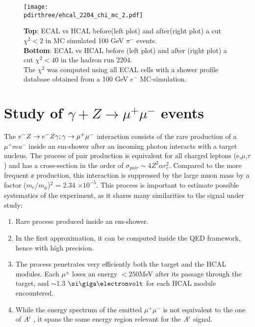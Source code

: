 \begin{figure}[h!]
  \begin{center}
    \texttt{[image: \\pdirthree/ehcal\_2204\_chi\_mc\_2.pdf]}
  \end{center}
  \caption{\textbf{Top}: ECAL vs HCAL before(left plot) and
    after(right plot) a cut
    $\chi^2<2$ in MC simulated 100 GeV $\pi^-$ events. \\
    \textbf{Bottom}: ECAL vs HCAL before (left plot) and after (right
    plot) a cut
    $\chi^2<40$ in the hadron run 2204.\\
    The $\chi^2$ was computed using all ECAL cells with a shower
    profile database obtained from a 100 GeV $e^-$ MC-simulation. }
  \label{fig:ehcal_hadr}
\end{figure}
\fi

\section{Study of $\gamma + Z \rightarrow \mu^+ \mu^-$ events }
\label{ch3:sec:dimuons}

The $e^- Z \to e^- Z \gamma; \gamma \to \mu^+ \mu^-$ interaction consists of the rare production of a $\mu^+mu^-$ inside an em-shower after an incoming photon interacts with a target nucleus. The process of pair production is equivalent for all charged leptons (e,$\mu$,$\tau$) and has a cross-section in the order of $\sigma_{pair} \sim 4Z^2\alpha r^2_c$. Compared to the more frequent $\ee$ production, this interaction is suppressed by the large muon mass by a factor ($m_e$/$m_{\mu}$)$^2$ = 2.34 $\times 10^{-5}$. This process is important to estimate possible systematics of the experiment, as it shares many similarities to the signal under study:

\begin{enumerate}
\item Rare process produced inside an em-shower.
\item In the first approximation, it can be computed inside the QED framework, hence with high precision.
\item The process penetrates very efficiently both the target and the HCAL modules. Each $\mu^{\pm}$ loses an energy $<250$\si{\mega\electronvolt} after its passage through the target, and $\sim$1.3 $\gev$ for each HCAL module encountered. 
\item While the energy spectrum of the emitted $\mu^+\mu^-$ is not equivalent to the one of $A'$ \cite{dimuon-mc}, it spans the same energy region relevant for the $A'$ signal.
\end{enumerate}

